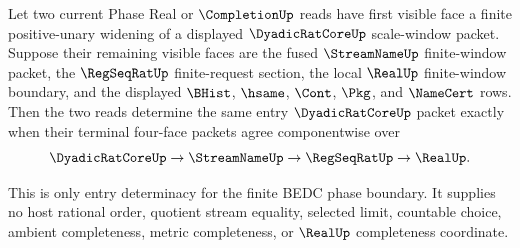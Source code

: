 \begin{theorem}
\label{thm:dyadicratcore-finite-tail-phase-entry-determinacy}
Let two current Phase Real or $\CompletionUp$ reads have first visible face a finite positive-unary widening of a displayed $\DyadicRatCoreUp$ scale-window packet. Suppose their remaining visible faces are the fused $\StreamNameUp$ finite-window packet, the $\RegSeqRatUp$ finite-request section, the local $\RealUp$ finite-window boundary, and the displayed $\BHist$, $\hsame$, $\Cont$, $\Pkg$, and $\NameCert$ rows. Then the two reads determine the same entry $\DyadicRatCoreUp$ packet exactly when their terminal four-face packets agree componentwise over
$$
\DyadicRatCoreUp \to \StreamNameUp \to \RegSeqRatUp \to \RealUp .
$$

This is only entry determinacy for the finite BEDC phase boundary. It supplies no host rational order, quotient stream equality, selected limit, countable choice, ambient completeness, metric completeness, or $\RealUp$ completeness coordinate.
\end{theorem}
